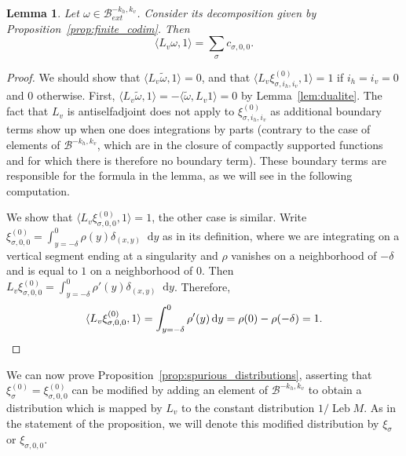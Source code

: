 \documentclass[11pt, a4paper, oneside, final, pagebackref]{amsart}
\newcommand{\boB}{\mathcal{B}}
\newcommand{\dd}{\mathop{}\!\mathrm{d}}
\DeclareMathOperator{\Leb}{Leb}
\newtheorem{lem}[thm]{Lemma}
\theoremstyle{definition}
\numberwithin{equation}{section}
\begin{document}
\begin{lem}
\label{lem:duality_ext} Let $\omega \in \boB^{-k_h, k_v}_{ext}$. Consider its
decomposition given by Proposition~\ref{prop:finite_codim}. Then
\begin{equation*}
  \langle L_v \omega, 1 \rangle = \sum_{\sigma} c_{\sigma, 0, 0}.
\end{equation*}
\end{lem}
\begin{proof}
We should show that $\langle L_v \tilde \omega, 1 \rangle = 0$, and that
$\langle L_v\xi^{(0)}_{\sigma, i_h, i_v}, 1\rangle = 1$ if $i_h=i_v=0$ and
$0$ otherwise. First, $\langle L_v \tilde \omega, 1 \rangle = - \langle
\tilde\omega, L_v 1 \rangle = 0$ by Lemma~\ref{lem:dualite}. The fact that
$L_v$ is antiselfadjoint does not apply to $\xi^{(0)}_{\sigma, i_h, i_v}$ as
additional boundary terms show up when one does integrations by parts
(contrary to the case of elements of $\boB^{-k_h, k_v}$, which are in the
closure of compactly supported functions and for which there is therefore no
boundary term). These boundary terms are responsible for the formula in the
lemma, as we will see in the following computation.

We show that $\langle L_v\xi^{(0)}_{\sigma, 0, 0}, 1\rangle = 1$, the other
case is similar. Write $\xi^{(0)}_{\sigma, 0, 0} = \int_{y=-\delta}^{0}
\rho(y) \delta_{(x,y)} \dd y$ as in its definition, where we are integrating
on a vertical segment ending at a singularity and $\rho$ vanishes on a
neighborhood of $-\delta$ and is equal to $1$ on a neighborhood of $0$. Then
$L_v \xi^{(0)}_{\sigma, 0, 0} = \int_{y=-\delta}^{0} \rho'(y) \delta_{(x,y)}
\dd y$. Therefore,
\begin{equation*}
  \langle L_v \xi^{(0)}_{\sigma, 0, 0}, 1 \rangle = \int_{y=-\delta}^{0} \rho'(y) \dd y
  = \rho (0) - \rho(-\delta) = 1.
  \qedhere
\end{equation*}
\end{proof}

We can now prove Proposition~\ref{prop:spurious_distributions}, asserting
that $\xi^{(0)}_\sigma = \xi^{(0)}_{\sigma, 0, 0}$ can be modified by adding
an element of $\boB^{-k_h, k_v}$ to obtain a distribution which is mapped by
$L_v$ to the constant distribution $1/\Leb M$. As in the statement of the
proposition, we will denote this modified distribution by $\xi_\sigma$ or
$\xi_{\sigma,0,0}$.
\end{document}
